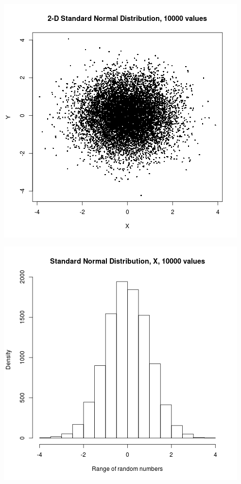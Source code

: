 \documentclass{article}
\begin{document}
\includegraphics{"plot1_3"}
\pagebreak

\includegraphics{"plot1_3_X"}
\pagebreak
\end{document}
